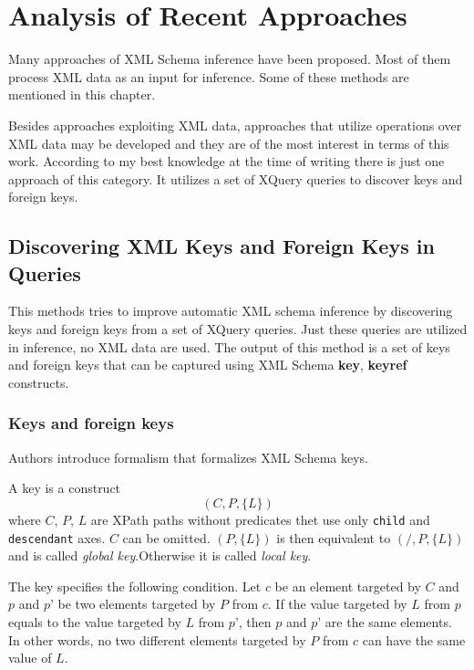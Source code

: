 \chapter{Analysis of Recent Approaches}
Many approaches of XML Schema inference have been proposed. Most of them process XML data as an input for inference. Some of these methods are mentioned in this chapter.

Besides approaches exploiting XML data, approaches that utilize operations over XML data may be developed and they are of the most interest in terms of this work. According to my best knowledge at the time of writing there is just one approach of this category. It utilizes a set of XQuery queries to discover keys and foreign keys.

\section{Discovering XML Keys and Foreign Keys in Queries}
This methods tries to improve automatic XML schema inference by discovering keys and foreign keys from a set of XQuery queries. Just these queries are utilized in inference, no XML data are used. The output of this method is a set of keys and foreign keys that can be captured using XML Schema \textbf{key}, \textbf{keyref}  constructs.

\subsection{Keys and foreign keys}
Authors introduce formalism that formalizes XML Schema keys.

\begin{define}[Key]
A key is a construct $$(C, P, \{L\})$$ where $C$, $P$, $L$ are XPath paths without predicates thet use only \texttt{child} and \texttt{descendant} axes.
$C$ can be omitted. $(P, \{L\})$ is then equivalent to $(/, P, \{L\})$ and is called \emph{global key}.Otherwise it is called \emph{local key}.
\end{define}

The key specifies the following condition. Let $c$ be an element targeted by $C$ and $p$ and $p’$ be two elements targeted by $P$ from $c$. If the value targeted by $L$ from $p$ equals to the value targeted by $L$ from $p’$, then $p$ and $p’$ are the same elements. In other words, no two different elements targeted by $P$ from $c$ can have the same value of $L$.


